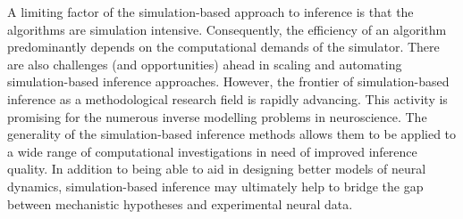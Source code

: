 

A limiting factor of the simulation-based approach to inference is that the algorithms are simulation intensive. Consequently, the efficiency of an algorithm predominantly depends on the computational demands of the simulator. There are also challenges (and opportunities) ahead in scaling and automating simulation-based inference approaches. However, the frontier of simulation-based inference as a methodological research field is rapidly advancing. This activity is promising for the numerous inverse modelling problems in neuroscience. The generality of the simulation-based inference methods allows them to be applied to a wide range of computational investigations in need of improved inference quality. In addition to being able to aid in designing better models of neural dynamics, simulation-based inference may ultimately help to bridge the gap between mechanistic hypotheses and experimental neural data. 




